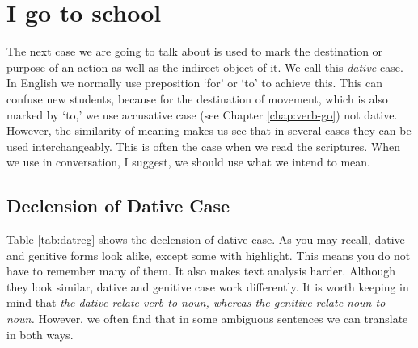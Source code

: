 \chapter{I go to school }\label{chap:dat}

The next case we are going to talk about is used to mark the destination or purpose of an action as well as the indirect object of it. We call this \emph{dative} case. In English we normally use preposition `for' or `to' to achieve this. This can confuse new students, because for the destination of movement, which is also marked by `to,' we use accusative case (see Chapter \ref{chap:verb-go}) not dative. However, the similarity of meaning makes us see that in several cases they can be used interchangeably. This is often the case when we read the scriptures. When we use in conversation, I suggest, we should use what we intend to mean.

{}
\section*{Declension of Dative Case}

Table \ref{tab:datreg} shows the declension of dative case. As you may recall, dative and genitive forms look alike, except some with highlight. This means you do not have to remember many of them. It also makes text analysis harder. Although they look similar, dative and genitive case work differently. It is worth keeping in mind that \emph{the dative relate verb to noun, whereas the genitive relate noun to noun.} However, we often find that in some ambiguous sentences we can translate in both ways.

